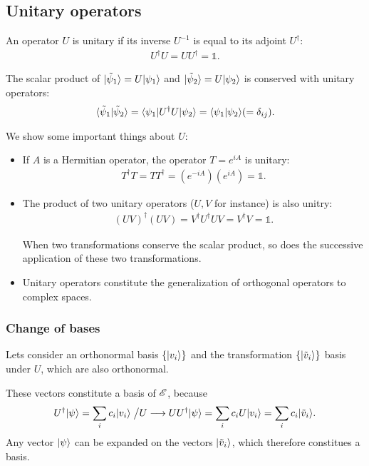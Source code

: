 \subsection{Unitary operators}
An operator $U$ is unitary if its inverse $U^{-1}$ is equal to its adjoint $U^\dagger$:
\begin{align}
    U^\dagger U=UU^\dagger=\mathds{1}.
\end{align}

The scalar product of $|\tilde{\psi}_1\rangle=U|\psi_1\rangle$ and $|\tilde{\psi}_2\rangle=U|\psi_2\rangle$ is conserved with unitary operators:
\begin{align*}
    \langle\tilde{\psi}_1|\tilde{\psi}_2\rangle=\langle\psi_1|U^\dagger U|\psi_2\rangle=\langle\psi_1|\psi_2\rangle(=\delta_{ij}).
\end{align*}

We show some important things about $U$:
\begin{itemize}[itemsep=0pt,topsep=0pt]
    \item If $A$ is a Hermitian operator, the operator $T=e^{iA}$ is unitary:
    \begin{align*}
        T^\dagger T=TT^\dagger=(e^{-iA})(e^{iA})=\mathds{1}.
    \end{align*}
    \item The product of two unitary operators ($U,V$ for instance) is also unitry:
    \begin{align*}
        (UV)^\dagger(UV)=V^\dagger U^\dagger UV=V^\dagger V=\mathds{1}.
    \end{align*}
    \begin{emphasizer}
        When two transformations conserve the scalar product, so does the successive application of these two transformations.
    \end{emphasizer}
    \item Unitary operators constitute the generalization of orthogonal operators to complex spaces.
\end{itemize}
\subsubsection{Change of bases}

Lets consider an orthonormal basis $\{|v_i\rangle\}$ and the transformation $\{|\tilde{v}_i\rangle\}$ basis under $U$, which are also orthonormal.

These vectors constitute a basis of $\mathscr{E}$, because 
\begin{align*}
    U^\dagger|\psi\rangle=\sum_ic_i|v_i\rangle\;\bigr/U\longrightarrow
    UU^\dagger|\psi\rangle=\sum_ic_iU|v_i\rangle=\sum_ic_i|\tilde{v}_i\rangle.
\end{align*}
Any vector $|\psi\rangle$ can be expanded on the vectors $|\tilde{v}_i\rangle$, which therefore constitues a basis.


